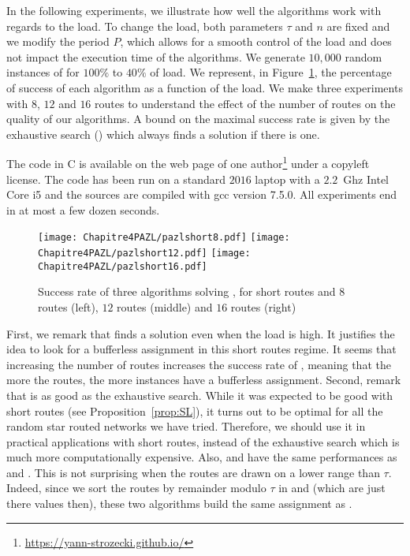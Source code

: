      In the following experiments, we illustrate how well the algorithms work with regards to the load. To change the load, both parameters $\tau$ and $n$ are fixed and we modify the period $P$, which allows for a smooth control of the load and does not impact the execution time of the algorithms.
	We generate $10,000$ random instances of \pazl for $100\%$ to $40\%$ of load. We represent, in Figure~\ref{fig:short}, the percentage of success of each algorithm as a function of the load. We make three experiments with $8$, $12$ and $16$ routes to understand the effect of the number of routes on the quality of our algorithms. A bound on the maximal success rate is given by the exhaustive search (\ESCA) which always finds a solution if there is one. 

         The code in C is available on the web page of one author\footnote{\url{https://yann-strozecki.github.io/}} under a copyleft license. The code has been run on a standard $2016$ laptop with a $2.2$~Ghz Intel Core i5 and the sources are compiled with gcc version 7.5.0. All experiments end in at most a few dozen seconds.



      \begin{figure}[h]
      \begin{center}
   \texttt{[image: Chapitre4PAZL/pazlshort8.pdf]}
   \texttt{[image: Chapitre4PAZL/pazlshort12.pdf]}
   \texttt{[image: Chapitre4PAZL/pazlshort16.pdf]}
      \end{center}
      \caption{Success rate of three algorithms solving \pazl, for short routes and $8$ routes (left), $12$ routes (middle) and $16$ routes (right)}\label{fig:short}
      \end{figure}

      First, we remark that \ESCA finds a solution even when the load is high. It justifies the idea to look for a bufferless assignment in this short routes regime. It seems that increasing the number of routes increases the success rate of \ESCA, meaning that the more the routes, the more instances have a bufferless assignment. 
      Second, remark that \shortestlongest is as good as the exhaustive search. While it was expected to be good with short routes (see Proposition~\ref{prop:SL}), it turns out to be optimal for all the random star routed networks we have tried. Therefore, we should use it in practical applications with short routes, instead of the exhaustive search which is much more computationally expensive. 
      Also, \compactpair and \compactfit have the same performances as \ESCA and \shortestlongest. This is not surprising when the routes are drawn on a lower range than $\tau$. Indeed, since we sort the routes by remainder modulo $\tau$  in \compactpair and \compactfit (which are just there values then), these two algorithms build the same assignment as \shortestlongest.

